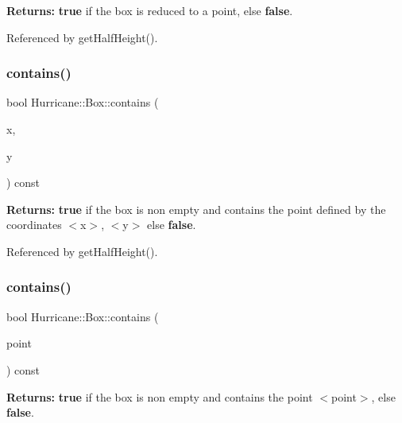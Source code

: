 {\bfseries Returns\+:} {\bfseries true} if the box is reduced to a point, else {\bfseries false}. 

Referenced by get\+Half\+Height().

\mbox{\label{classHurricane_1_1Box_ae18dd30ffbf0b75714ece480f21e2898}} 
\subsubsection{\texorpdfstring{contains()}{contains()}\hspace{0.1cm}{\footnotesize\ttfamily [1/3]}}
{\footnotesize\ttfamily bool Hurricane\+::\+Box\+::contains (\begin{DoxyParamCaption}\item[{const \hyperlink{group__DbUGroup_ga4fbfa3e8c89347af76c9628ea06c4146}{Db\+U\+::\+Unit} \&}]{x,  }\item[{const \hyperlink{group__DbUGroup_ga4fbfa3e8c89347af76c9628ea06c4146}{Db\+U\+::\+Unit} \&}]{y }\end{DoxyParamCaption}) const}

{\bfseries Returns\+:} {\bfseries true} if the box is non empty and contains the point defined by the coordinates {\ttfamily $<$x$>$}, {\ttfamily $<$y$>$} else {\bfseries false}. 

Referenced by get\+Half\+Height().

\mbox{\label{classHurricane_1_1Box_a19ad23904fbfe2afb3683affeb2cac7e}} 
\subsubsection{\texorpdfstring{contains()}{contains()}\hspace{0.1cm}{\footnotesize\ttfamily [2/3]}}
{\footnotesize\ttfamily bool Hurricane\+::\+Box\+::contains (\begin{DoxyParamCaption}\item[{const \hyperlink{classHurricane_1_1Point}{Point} \&}]{point }\end{DoxyParamCaption}) const}

{\bfseries Returns\+:} {\bfseries true} if the box is non empty and contains the point {\ttfamily $<$point$>$}, else {\bfseries false}. \mbox{\label{classHurricane_1_1Box_ac567c569f23643e58867afee80f6920a}} 
